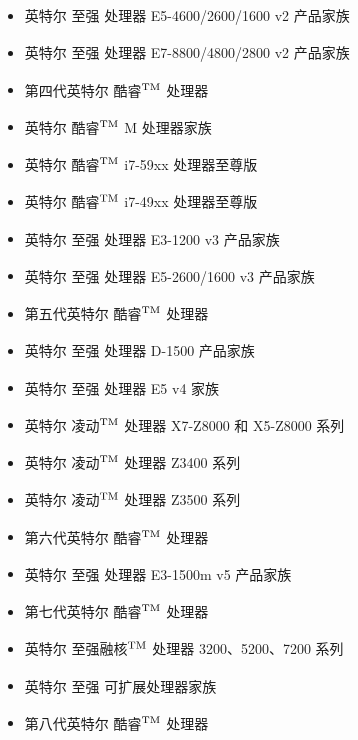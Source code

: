\documentclass{article}
\begin{document}
\begin{itemize}
\item 英特尔\textsuperscript{\textregistered}  至强\textsuperscript{\textregistered}  处理器 E5-4600/2600/1600 v2 产品家族
\item 英特尔\textsuperscript{\textregistered}  至强\textsuperscript{\textregistered}  处理器 E7-8800/4800/2800 v2 产品家族
\item 第四代英特尔\textsuperscript{\textregistered}  酷睿$^{\rm{TM}}$ 处理器
\item 英特尔\textsuperscript{\textregistered}  酷睿$^{\rm{TM}}$ M 处理器家族
\item 英特尔\textsuperscript{\textregistered}  酷睿$^{\rm{TM}}$ i7-59xx 处理器至尊版
\item 英特尔\textsuperscript{\textregistered}  酷睿$^{\rm{TM}}$ i7-49xx 处理器至尊版
\item 英特尔\textsuperscript{\textregistered}  至强\textsuperscript{\textregistered}  处理器 E3-1200 v3 产品家族
\item 英特尔\textsuperscript{\textregistered}  至强\textsuperscript{\textregistered}  处理器 E5-2600/1600 v3 产品家族
\item 第五代英特尔\textsuperscript{\textregistered}  酷睿$^{\rm{TM}}$ 处理器
\item 英特尔\textsuperscript{\textregistered}  至强\textsuperscript{\textregistered}  处理器 D-1500 产品家族
\item 英特尔\textsuperscript{\textregistered}  至强\textsuperscript{\textregistered}  处理器 E5 v4 家族
\item 英特尔\textsuperscript{\textregistered}  凌动$^{\rm{TM}}$ 处理器 X7-Z8000 和 X5-Z8000 系列
\item 英特尔\textsuperscript{\textregistered}  凌动$^{\rm{TM}}$ 处理器 Z3400 系列
\item 英特尔\textsuperscript{\textregistered}  凌动$^{\rm{TM}}$ 处理器 Z3500 系列
\item 第六代英特尔\textsuperscript{\textregistered}  酷睿$^{\rm{TM}}$ 处理器
\item 英特尔\textsuperscript{\textregistered}  至强\textsuperscript{\textregistered}  处理器 E3-1500m v5 产品家族
\item 第七代英特尔\textsuperscript{\textregistered}  酷睿$^{\rm{TM}}$ 处理器
\item 英特尔\textsuperscript{\textregistered}  至强融核$^{\rm{TM}}$ 处理器 3200、5200、7200 系列
\item 英特尔\textsuperscript{\textregistered}  至强\textsuperscript{\textregistered}  可扩展处理器家族
\item 第八代英特尔\textsuperscript{\textregistered}  酷睿$^{\rm{TM}}$ 处理器

\end{itemize}
\end{document}
